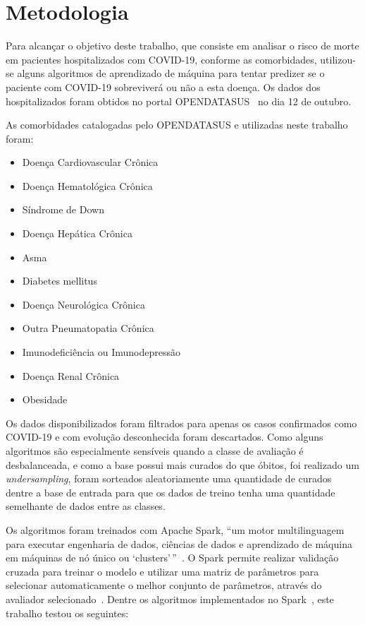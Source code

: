 \chapter{Metodologia}
\label{ch:metodologia}

Para alcançar o objetivo deste trabalho, que consiste em analisar o risco de morte em pacientes hospitalizados com COVID-19, conforme as comorbidades, utilizou-se alguns algoritmos de aprendizado de máquina para tentar predizer se o paciente com COVID-19 sobreviverá ou não a esta doença.
Os dados dos hospitalizados foram obtidos no portal OPENDATASUS~\cite{opendatasus2020,opendatasus20212022} no dia 12 de outubro.

As comorbidades catalogadas pelo OPENDATASUS e utilizadas neste trabalho foram:

\begin{itemize}
    \item Doença Cardiovascular Crônica
    \item Doença Hematológica Crônica
    \item Síndrome de Down
    \item Doença Hepática Crônica
    \item Asma
    \item Diabetes mellitus
    \item Doença Neurológica Crônica
    \item Outra Pneumatopatia Crônica
    \item Imunodeficiência ou Imunodepressão
    \item Doença Renal Crônica
    \item Obesidade
\end{itemize}

Os dados disponibilizados foram filtrados para apenas os casos confirmados como COVID-19 e com evolução desconhecida foram descartados.
Como alguns algoritmos são especialmente sensíveis quando a classe de avaliação é desbalanceada, e como a base possui mais curados do que óbitos, foi realizado um \textit{undersampling}, foram sorteados aleatoriamente uma quantidade de curados dentre a base de entrada para que os dados de treino tenha uma quantidade semelhante de dados entre as classes.

Os algoritmos foram treinados com Apache Spark, ``um motor multilinguagem para executar engenharia de dados, ciências de dados e aprendizado de máquina em máquinas de nó único ou `clusters'\,''~\cite{apachespark}.
O Spark permite realizar validação cruzada para treinar o modelo e utilizar uma matriz de parâmetros para selecionar automaticamente o melhor conjunto de parâmetros, através do avaliador selecionado~\cite{apachesparkcv}.
Dentre os algoritmos implementados no Spark~\cite{apachesparkml}, este trabalho testou os seguintes:

